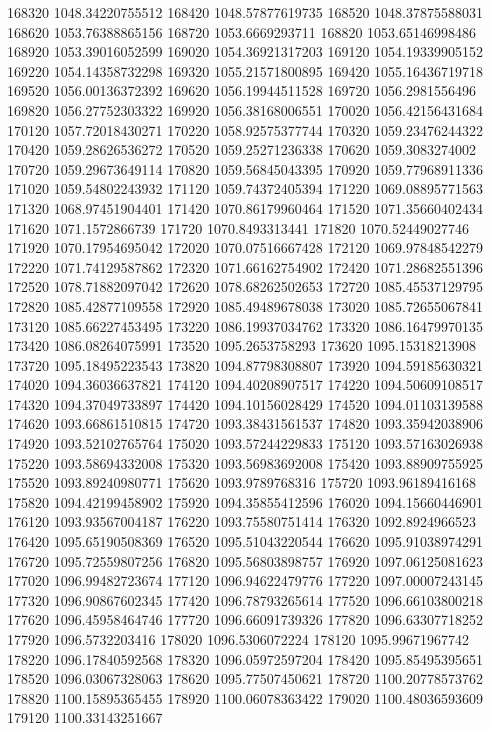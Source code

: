 {168320 1048.34220755512
168420 1048.57877619735
168520 1048.37875588031
168620 1053.76388865156
168720 1053.6669293711
168820 1053.65146998486
168920 1053.39016052599
169020 1054.36921317203
169120 1054.19339905152
169220 1054.14358732298
169320 1055.21571800895
169420 1055.16436719718
169520 1056.00136372392
169620 1056.19944511528
169720 1056.2981556496
169820 1056.27752303322
169920 1056.38168006551
170020 1056.42156431684
170120 1057.72018430271
170220 1058.92575377744
170320 1059.23476244322
170420 1059.28626536272
170520 1059.25271236338
170620 1059.3083274002
170720 1059.29673649114
170820 1059.56845043395
170920 1059.77968911336
171020 1059.54802243932
171120 1059.74372405394
171220 1069.08895771563
171320 1068.97451904401
171420 1070.86179960464
171520 1071.35660402434
171620 1071.1572866739
171720 1070.8493313441
171820 1070.52449027746
171920 1070.17954695042
172020 1070.07516667428
172120 1069.97848542279
172220 1071.74129587862
172320 1071.66162754902
172420 1071.28682551396
172520 1078.71882097042
172620 1078.68262502653
172720 1085.45537129795
172820 1085.42877109558
172920 1085.49489678038
173020 1085.72655067841
173120 1085.66227453495
173220 1086.19937034762
173320 1086.16479970135
173420 1086.08264075991
173520 1095.2653758293
173620 1095.15318213908
173720 1095.18495223543
173820 1094.87798308807
173920 1094.59185630321
174020 1094.36036637821
174120 1094.40208907517
174220 1094.50609108517
174320 1094.37049733897
174420 1094.10156028429
174520 1094.01103139588
174620 1093.66861510815
174720 1093.38431561537
174820 1093.35942038906
174920 1093.52102765764
175020 1093.57244229833
175120 1093.57163026938
175220 1093.58694332008
175320 1093.56983692008
175420 1093.88909755925
175520 1093.89240980771
175620 1093.9789768316
175720 1093.96189416168
175820 1094.42199458902
175920 1094.35855412596
176020 1094.15660446901
176120 1093.93567004187
176220 1093.75580751414
176320 1092.8924966523
176420 1095.65190508369
176520 1095.51043220544
176620 1095.91038974291
176720 1095.72559807256
176820 1095.56803898757
176920 1097.06125081623
177020 1096.99482723674
177120 1096.94622479776
177220 1097.00007243145
177320 1096.90867602345
177420 1096.78793265614
177520 1096.66103800218
177620 1096.45958464746
177720 1096.66091739326
177820 1096.63307718252
177920 1096.5732203416
178020 1096.5306072224
178120 1095.99671967742
178220 1096.17840592568
178320 1096.05972597204
178420 1095.85495395651
178520 1096.03067328063
178620 1095.77507450621
178720 1100.20778573762
178820 1100.15895365455
178920 1100.06078363422
179020 1100.48036593609
179120 1100.33143251667
}
